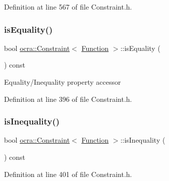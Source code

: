 Definition at line 567 of file Constraint.\+h.

\hypertarget{classocra_1_1Constraint_3_01Function_01_4_a3c7d085d888ef8937977129740d4c8a6}{}\label{classocra_1_1Constraint_3_01Function_01_4_a3c7d085d888ef8937977129740d4c8a6} 
\subsubsection{\texorpdfstring{is\+Equality()}{isEquality()}}
{\footnotesize\ttfamily bool \hyperlink{classocra_1_1Constraint}{ocra\+::\+Constraint}$<$ \hyperlink{classocra_1_1Function}{Function} $>$\+::is\+Equality (\begin{DoxyParamCaption}{ }\end{DoxyParamCaption}) const\hspace{0.3cm}{\ttfamily [inline]}}

Equality/\+Inequality property accessor 

Definition at line 396 of file Constraint.\+h.

\hypertarget{classocra_1_1Constraint_3_01Function_01_4_ab9083572de0c38297a7c20d88b82e183}{}\label{classocra_1_1Constraint_3_01Function_01_4_ab9083572de0c38297a7c20d88b82e183} 
\subsubsection{\texorpdfstring{is\+Inequality()}{isInequality()}}
{\footnotesize\ttfamily bool \hyperlink{classocra_1_1Constraint}{ocra\+::\+Constraint}$<$ \hyperlink{classocra_1_1Function}{Function} $>$\+::is\+Inequality (\begin{DoxyParamCaption}{ }\end{DoxyParamCaption}) const\hspace{0.3cm}{\ttfamily [inline]}}



Definition at line 401 of file Constraint.\+h.

\hypertarget{classocra_1_1Constraint_3_01Function_01_4_a8406632b9e28804d9d8848a8e71ccbd8}{}\label{classocra_1_1Constraint_3_01Function_01_4_a8406632b9e28804d9d8848a8e71ccbd8} 
